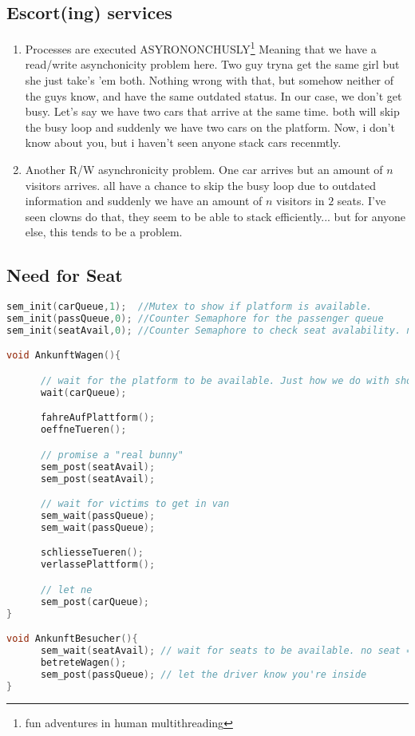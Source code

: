 \documentclass[a4paper, 11pt]{article}
\begin{document}
    \subsection{Escort(ing) services}

    \begin{enumerate}
          \item Processes are executed ASYRONONCHUSLY\footnote{fun adventures in human multithreading} Meaning that we have a read/write asynchonicity problem here.
                Two guy tryna get the same girl but she just take's 'em both. Nothing wrong with that, but somehow neither of the guys know, and have the same outdated status.
                In our case, we don't get busy. Let's say we have two cars that arrive at the same time. both will skip the busy loop and suddenly we have two cars on the platform.
                Now, i don't know about you, but i haven't seen anyone stack cars recenmtly.
          \item Another R/W asynchronicity problem. One car arrives but an amount of $n$ visitors arrives. all have a chance to skip the busy loop due to outdated information and suddenly we have an amount of $n$ visitors in $2$ seats.
                I've seen clowns do that, they seem to be able to stack efficiently... but for anyone else, this tends to be a problem.
    \end{enumerate}
    \subsection{Need for Seat}
    \begin{lstlisting}[language=c]
sem_init(carQueue,1);  //Mutex to show if platform is available. 
sem_init(passQueue,0); //Counter Semaphore for the passenger queue
sem_init(seatAvail,0); //Counter Semaphore to check seat avalability. no seat = no car

void AnkunftWagen(){

      // wait for the platform to be available. Just how we do with shoes.
      wait(carQueue);

      fahreAufPlattform();
      oeffneTueren();

      // promise a "real bunny"
      sem_post(seatAvail);
      sem_post(seatAvail);

      // wait for victims to get in van
      sem_wait(passQueue);
      sem_wait(passQueue);

      schliesseTueren();
      verlassePlattform();

      // let ne
      sem_post(carQueue);
}

void AnkunftBesucher(){
      sem_wait(seatAvail); // wait for seats to be available. no seat = no car
      betreteWagen();
      sem_post(passQueue); // let the driver know you're inside
}
    \end{lstlisting}
    \newpage
\end{document}
